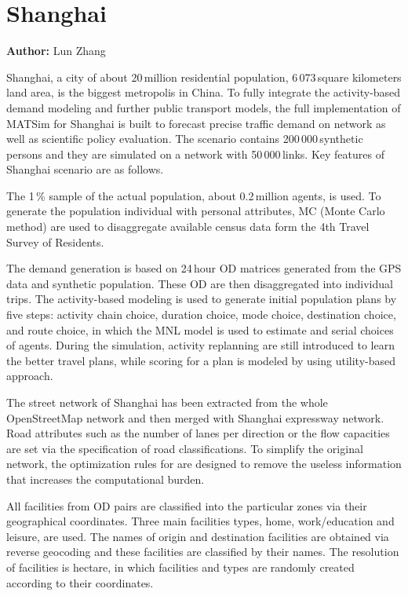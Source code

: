 \section{Shanghai}
\label{sec:shanghai}
\hfill \textbf{Author:} Lun Zhang

Shanghai, a city of about 20\,million residential population, 6\,073\,square kilometers land area, is the biggest metropolis in China. To fully integrate the activity-based demand modeling and further public transport models, the full implementation of MATSim for Shanghai is built to forecast precise traffic demand on network as well as scientific policy evaluation. The scenario contains 200\,000\,synthetic persons and they are simulated on a network with 50\,000\,links. Key features of Shanghai scenario are as follows.

The 1\,\% sample of the actual population, about 0.2\,million agents, is used. To generate the population individual with personal attributes, MC (Monte Carlo method) are used to disaggregate available census data form the 4th Travel Survey of Residents.

The demand generation is based on 24\,hour OD matrices generated from the GPS data and synthetic population. These OD are then disaggregated into individual trips. The activity-based modeling is used to generate initial population plans by five steps: activity chain choice, duration choice, mode choice, destination choice, and route choice, in which the MNL model is used to estimate and serial choices of agents. During the simulation, activity replanning are still introduced to learn the better travel plans, while scoring for a plan is modeled by using utility-based approach.

The street network of Shanghai has been extracted from the whole OpenStreetMap network and then merged with Shanghai expressway network. Road attributes such as the number of lanes per direction or the flow capacities are set via the specification of road classifications. To simplify the original network, the optimization rules for are designed to remove the useless information that increases the computational burden.

All facilities from OD pairs are classified into the particular zones via their geographical coordinates. Three main facilities types, home, work/education and leisure, are used. The names of origin and destination facilities are obtained via reverse geocoding and these facilities are classified by their names. The resolution of facilities is hectare, in which facilities and types are randomly created according to their coordinates.

